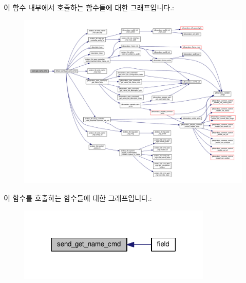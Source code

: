 이 함수 내부에서 호출하는 함수들에 대한 그래프입니다.\+:
\nopagebreak
\begin{figure}[H]
\begin{center}
\leavevmode
\includegraphics[width=350pt]{classavdecc__lib_1_1descriptor__base__imp_a4e8ce103baabbd5fc07deabfb95f791a_cgraph}
\end{center}
\end{figure}




이 함수를 호출하는 함수들에 대한 그래프입니다.\+:
\nopagebreak
\begin{figure}[H]
\begin{center}
\leavevmode
\includegraphics[width=261pt]{classavdecc__lib_1_1descriptor__base__imp_a4e8ce103baabbd5fc07deabfb95f791a_icgraph}
\end{center}
\end{figure}


